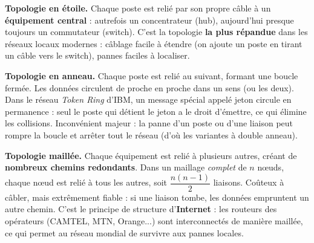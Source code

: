 \documentclass[11pt]{article}
\newcommand{\cle}[1]{{\popxbold\color{popdark}#1}}
\begin{document}
\textbf{Topologie en étoile.} Chaque poste est relié par son propre câble à un \textbf{équipement central} : autrefois un concentrateur (hub), aujourd'hui presque toujours un \cle{commutateur} (switch). C'est la topologie \textbf{la plus répandue} dans les réseaux locaux modernes : câblage facile à étendre (on ajoute un poste en tirant un câble vers le switch), pannes faciles à localiser.

\textbf{Topologie en anneau.} Chaque poste est relié au suivant, formant une boucle fermée. Les données circulent de proche en proche dans un sens (ou les deux). Dans le réseau \emph{Token Ring} d'IBM, un message spécial appelé \cle{jeton} circule en permanence : seul le poste qui détient le jeton a le droit d'émettre, ce qui élimine les collisions. Inconvénient majeur : la panne d'un poste ou d'une liaison peut rompre la boucle et arrêter tout le réseau (d'où les variantes à double anneau).

\textbf{Topologie maillée.} Chaque équipement est relié à plusieurs autres, créant de \textbf{nombreux chemins redondants}. Dans un maillage \emph{complet} de $n$ nœuds, chaque nœud est relié à tous les autres, soit $\dfrac{n(n-1)}{2}$ liaisons. Coûteux à câbler, mais extrêmement fiable : si une liaison tombe, les données empruntent un autre chemin. C'est le principe de structure d'\textbf{Internet} : les routeurs des opérateurs (CAMTEL, MTN, Orange...) sont interconnectés de manière maillée, ce qui permet au réseau mondial de survivre aux pannes locales.
\end{document}
